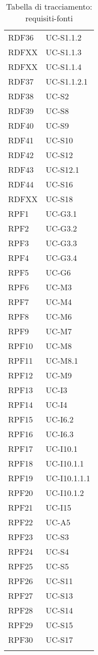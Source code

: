 \begin{longtable}{| p{5cm} | p{5cm} |}
		\rowcolor{LightGray}
		RDF36 & UC-S1.1.2\\
		RDFXX & UC-S1.1.3\\%
		RDFXX & UC-S1.1.4\\		%
		RDF37 & UC-S1.1.2.1 \\
		\rowcolor{LightGray}
		RDF38 & UC-S2\\
		RDF39 & UC-S8\\
		\rowcolor{LightGray}
		RDF40 & UC-S9\\
		RDF41 & UC-S10\\
		\rowcolor{LightGray}
		RDF42 & UC-S12 \\
		RDF43 & UC-S12.1 \\
		\rowcolor{LightGray}
		RDF44 & UC-S16\\
		RDFXX & UC-S18\\		%
		RPF1 & UC-G3.1\\
		\rowcolor{LightGray}
		RPF2 & UC-G3.2\\
		RPF3 & UC-G3.3\\
		\rowcolor{LightGray}
		RPF4 & UC-G3.4\\
		RPF5 & UC-G6\\
		\rowcolor{LightGray}
		RPF6 & UC-M3\\
		RPF7 & UC-M4\\
		\rowcolor{LightGray}
		RPF8 & UC-M6\\
		RPF9 & UC-M7\\
		\rowcolor{LightGray}
		RPF10 & UC-M8\\
		RPF11 & UC-M8.1\\
		\rowcolor{LightGray}
		RPF12 & UC-M9\\
		RPF13 & UC-I3\\
		\rowcolor{LightGray}
		RPF14 & UC-I4\\
		RPF15 & UC-I6.2\\
		\rowcolor{LightGray}
		RPF16 & UC-I6.3\\
		RPF17 & UC-I10.1\\
		\rowcolor{LightGray}
		RPF18 & UC-I10.1.1\\
		RPF19 & UC-I10.1.1.1\\
		\rowcolor{LightGray}
		RPF20 & UC-I10.1.2\\		
		RPF21 & UC-I15\\
		\rowcolor{LightGray}
		RPF22 & UC-A5\\
		RPF23 & UC-S3\\
		\rowcolor{LightGray}
		RPF24 & UC-S4\\
		RPF25 & UC-S5\\
		\rowcolor{LightGray}
		RPF26 & UC-S11\\
		RPF27 & UC-S13\\
		\rowcolor{LightGray}
		RPF28 & UC-S14\\	
		RPF29 & UC-S15\\
		\rowcolor{LightGray}
		RPF30 & UC-S17\\
		\hline
		\caption{Tabella di tracciamento: requisiti-fonti}
\end{longtable}

